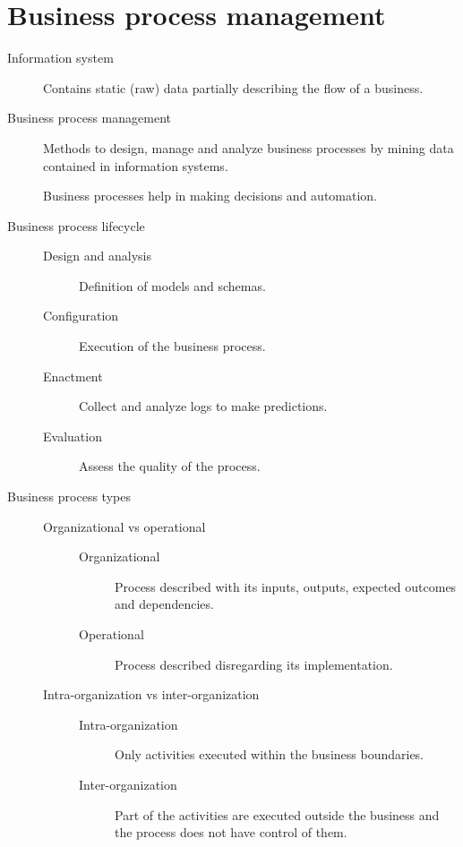 \chapter{Business process management}

\begin{description}
    \item[Information system] 
        Contains static (raw) data partially describing the flow of a business.

    \item[Business process management] 
        Methods to design, manage and analyze business processes by mining data contained in information systems.

        Business processes help in making decisions and automation.

    \item[Business process lifecycle] \phantom{}
        \begin{description}
            \item[Design and analysis]
                Definition of models and schemas.
            \item[Configuration]
                Execution of the business process.
            \item[Enactment]
                Collect and analyze logs to make predictions.
            \item[Evaluation]
                Assess the quality of the process.
        \end{description}

    \item[Business process types] \phantom{}
        \begin{description}
            \item[Organizational vs operational] \phantom{} 
                \begin{description}
                    \item[Organizational]
                        Process described with its inputs, outputs, expected outcomes and dependencies.
                    \item[Operational]
                        Process described disregarding its implementation.
                \end{description}

            \item[Intra-organization vs inter-organization] \phantom{}
                \begin{description}
                    \item[Intra-organization]
                        Only activities executed within the business boundaries.
                    \item[Inter-organization]
                        Part of the activities are executed outside the business and the process does not have control of them.
                \end{description}


\end{description}
\end{description}

